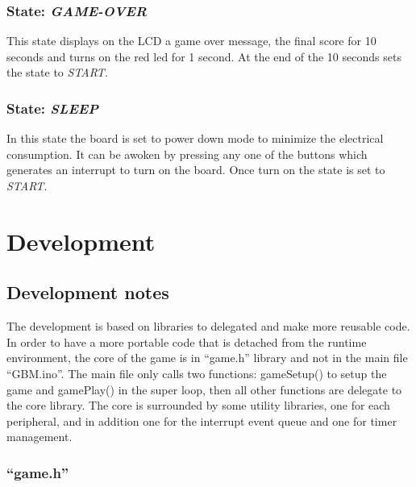 \documentclass[a4paper,12pt]{report}
\begin{document}
    \subsection{State: \textit{GAME-OVER}}
        This state displays on the LCD a game over message, the final score for 10 seconds and turns on the red led for 1 second. At the end of the 10 seconds sets the state to \textit{START}. 
    \subsection{State: \textit{SLEEP}}
        In this state the board is set to power down mode to minimize the electrical consumption. It can be awoken by pressing any one of the buttons which generates an interrupt to turn on the board. Once turn on the state is set to \textit{START}.
    

\chapter{Development}

    \section{Development notes}

    The development is based on libraries to delegated and make more reusable code. 
    In order to have a more portable code that is detached from the runtime environment, the core of the game is in ``game.h'' library and not in the main file ``GBM.ino''. The main file only calls two functions: gameSetup() to setup the game and gamePlay() in the super loop, then all other functions are delegate to the core library.
    The core is surrounded by some utility libraries, one for each peripheral, and in addition one for the interrupt event queue and one for timer management. 

    \subsection{``game.h''}
\end{document}
